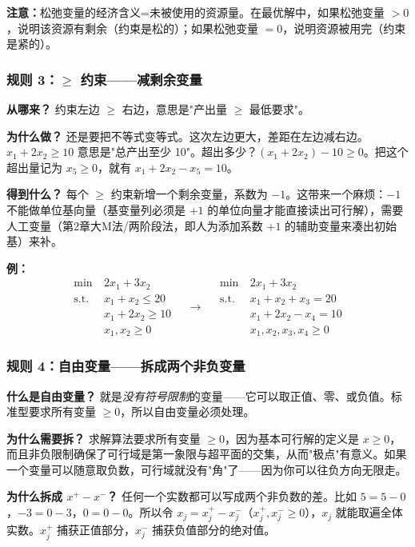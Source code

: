 \textbf{注意：}松弛变量的经济含义=未被使用的资源量。在最优解中，如果松弛变量 $>0$，说明该资源有剩余（约束是松的）；如果松弛变量 $=0$，说明资源被用完（约束是紧的）。

\subsubsection{规则 3：$\ge$ 约束——减剩余变量}

\textbf{从哪来？} 约束左边 $\ge$ 右边，意思是"产出量 $\ge$ 最低要求"。

\textbf{为什么做？} 还是要把不等式变等式。这次左边更大，差距在左边减右边。$x_1+2x_2\ge 10$ 意思是"总产出至少 10"。超出多少？$(x_1+2x_2)-10 \ge 0$。把这个超出量记为 $x_5\ge 0$，就有 $x_1+2x_2-x_5=10$。

\textbf{得到什么？} 每个 $\ge$ 约束新增一个剩余变量，系数为 $-1$。这带来一个麻烦：$-1$ 不能做单位基向量（基变量列必须是 $+1$ 的单位向量才能直接读出可行解），需要人工变量（第2章大M法/两阶段法，即人为添加系数 $+1$ 的辅助变量来凑出初始基）来补。

\textbf{例：}
\[
\begin{aligned}
\min\ & 2x_1 + 3x_2 \\
\text{s.t.}\ & x_1 + x_2 \le 20 \\
& x_1 + 2x_2 \ge 10 \\
& x_1, x_2 \ge 0
\end{aligned}
\quad\longrightarrow\quad
\begin{aligned}
\min\ & 2x_1 + 3x_2 \\
\text{s.t.}\ & x_1 + x_2 + x_3 = 20 \\
& x_1 + 2x_2 - x_4 = 10 \\
& x_1,x_2,x_3,x_4 \ge 0
\end{aligned}
\]

\subsubsection{规则 4：自由变量——拆成两个非负变量}

\textbf{什么是自由变量？} 就是\emph{没有符号限制}的变量——它可以取正值、零、或负值。标准型要求所有变量 $\ge 0$，所以自由变量必须处理。

\textbf{为什么需要拆？} 求解算法要求所有变量 $\ge 0$，因为基本可行解的定义是 $x\ge 0$，而且非负限制确保了可行域是第一象限与超平面的交集，从而"极点"有意义。如果一个变量可以随意取负数，可行域就没有"角"了——因为你可以往负方向无限走。

\textbf{为什么拆成 $x^+ - x^-$？} 任何一个实数都可以写成两个非负数的差。比如 $5 = 5-0$，$-3 = 0-3$，$0=0-0$。所以令 $x_j = x_j^+ - x_j^-$（$x_j^+,x_j^-\ge 0$），$x_j$ 就能取遍全体实数。$x_j^+$ 捕获正值部分，$x_j^-$ 捕获负值部分的绝对值。

